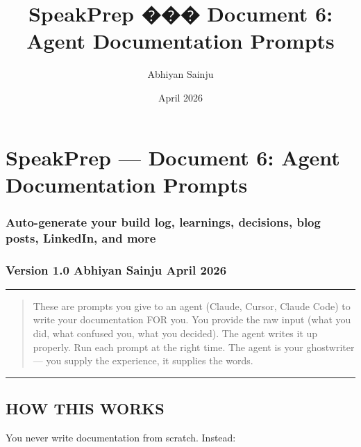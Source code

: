\documentclass[
  11pt,
]{article}
\title{SpeakPrep ��� Document 6: Agent Documentation Prompts}
\author{Abhiyan Sainju}
\date{April 2026}
\begin{document}
\maketitle

\hypertarget{speakprep-document-6-agent-documentation-prompts}{%
\section{SpeakPrep --- Document 6: Agent Documentation
Prompts}\label{speakprep-document-6-agent-documentation-prompts}}

\hypertarget{auto-generate-your-build-log-learnings-decisions-blog-posts-linkedin-and-more}{%
\subsubsection{Auto-generate your build log, learnings, decisions, blog
posts, LinkedIn, and
more}\label{auto-generate-your-build-log-learnings-decisions-blog-posts-linkedin-and-more}}

\hypertarget{version-1.0-abhiyan-sainju-april-2026}{%
\subsubsection{Version 1.0 \textbar{} Abhiyan Sainju \textbar{} April
2026}\label{version-1.0-abhiyan-sainju-april-2026}}

\begin{center}\rule{0.5\linewidth}{0.5pt}\end{center}

\begin{quote}
These are prompts you give to an agent (Claude, Cursor, Claude Code) to
write your documentation FOR you. You provide the raw input (what you
did, what confused you, what you decided). The agent writes it up
properly. Run each prompt at the right time. The agent is your
ghostwriter --- you supply the experience, it supplies the words.
\end{quote}

\begin{center}\rule{0.5\linewidth}{0.5pt}\end{center}

\hypertarget{how-this-works}{%
\subsection{HOW THIS WORKS}\label{how-this-works}}

You never write documentation from scratch. Instead:
\end{document}
